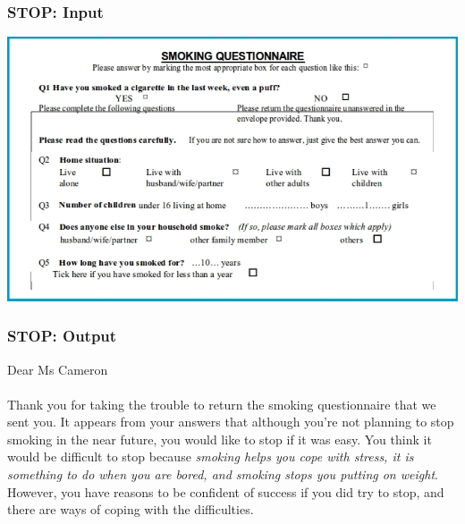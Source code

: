 \documentclass[compress,color=usenames]{beamer}
\begin{document}
\begin{frame}
\frametitle{STOP: Input}

\begin{center}
\includegraphics[scale=.4]{pics/pic4.jpg}
\end{center}

\end{frame}

\begin{frame}
\frametitle{STOP: Output}

Dear Ms Cameron\\ \ \\

 { {Thank you for taking the trouble to return the smoking questionnaire that we sent you. It appears from your answers that although you're not planning to stop smoking in the near future, you would like to stop if it was easy. You think it would be difficult to stop because \textit{smoking helps you cope with stress, it is something to do when you are bored, and smoking stops you putting on weight}. However, you have reasons to be confident of success if you did try to stop, and there are ways of coping with the difficulties. }}

\end{frame}
\end{document}
